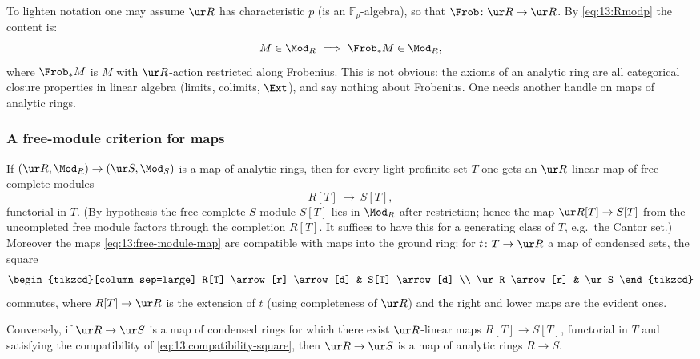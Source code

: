 To lighten notation one may assume $\ur R$ has characteristic $p$ (is an
$\mathbb{F}_p$-algebra), so that $\Frob\colon\ur R\to\ur R$. By
\eqref{eq:13:Rmodp} the content is:
\begin{equation*}
M\in\Mod_R\ \Longrightarrow\ \Frob_* M\in\Mod_R,
\end{equation*}
where $\Frob_*M$ is $M$ with $\ur R$-action restricted along Frobenius. This is
not obvious: the axioms of an analytic ring are all categorical closure
properties in linear algebra (limits, colimits, $\Ext$), and say nothing about
Frobenius. One needs another handle on maps of analytic rings.

\subsubsection*{A free-module criterion for maps}

\begin{proposition}
\label{prop:13:free-module-data}
If $(\ur R,\Mod_R)\to(\ur S,\Mod_S)$ is a map of analytic rings, then for every
light profinite set $T$ one gets an $\ur R$-linear map of free complete modules
\begin{equation}
\label{eq:13:free-module-map}
R[T]\ \longrightarrow\ S[T],
\end{equation}
functorial in $T$. (By hypothesis the free complete $S$-module $S[T]$ lies in
$\Mod_R$ after restriction; hence the map $\ur R[T]\to S[T]$ from the uncompleted
free module factors through the completion $R[T]$. It suffices to have this for a
generating class of $T$, e.g.\ the Cantor set.) Moreover the maps
\eqref{eq:13:free-module-map} are compatible with maps into the ground ring: for
$t\colon T\to\ur R$ a map of condensed sets, the square
\begin{equation}
\label{eq:13:compatibility-square}
\begin{tikzcd}[column sep=large]
R[T] \arrow[r] \arrow[d] & S[T] \arrow[d] \\
\ur R \arrow[r] & \ur S
\end{tikzcd}
\end{equation}
commutes, where $R[T]\to\ur R$ is the extension of $t$ (using completeness of
$\ur R$) and the right and lower maps are the evident ones.
\end{proposition}

\begin{lemma}
\label{lem:13:sufficiency}
Conversely, if $\ur R\to\ur S$ is a map of condensed rings for which there exist
$\ur R$-linear maps $R[T]\to S[T]$, functorial in $T$ and satisfying the
compatibility of \eqref{eq:13:compatibility-square}, then $\ur R\to\ur S$ is a
map of analytic rings $R\to S$.
\end{lemma}

